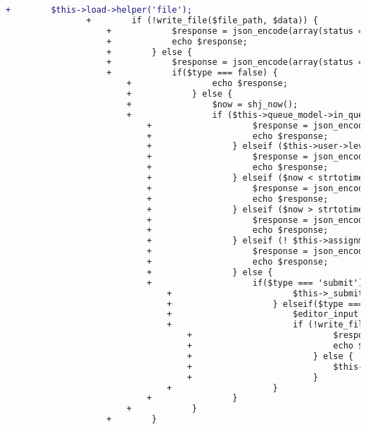 \begin{lstlisting}[language=diff, caption=Perubahan pada kode Submit.php]
				+        $this->load->helper('file');
				+        if (!write_file($file_path, $data)) {
					+            $response = json_encode(array(status => false, message => 'Unable to save'));
					+            echo $response;
					+        } else {
					+            $response = json_encode(array(status => true, message => 'Saved'));
					+            if($type === false) {
						+                echo $response;
						+            } else {
						+                $now = shj_now();
						+                if ($this->queue_model->in_queue($this->user->username, $this->user->selected_assignment['id'], $this->problem['id'])) {
							+                    $response = json_encode(array(status => false, message => 'You have already submitted for this problem. Your last submission is still in queue.'));
							+                    echo $response;
							+                } elseif ($this->user->level == 0 && !$this->user->selected_assignment['open']) {
							+                    $response = json_encode(array(status => false, message => 'Selected assignment has been closed.'));
							+                    echo $response;
							+                } elseif ($now < strtotime($this->user->selected_assignment['start_time'])) {
							+                    $response = json_encode(array(status => false, message => 'Selected assignment has not started.'));
							+                    echo $response;
							+                } elseif ($now > strtotime($this->user->selected_assignment['finish_time']) + $this->user->selected_assignment['extra_time']) {
							+                    $response = json_encode(array(status => false, message => 'Selected assignment has finished.'));
							+                    echo $response;
							+                } elseif (! $this->assignment_model->is_participant($this->user->selected_assignment['participants'], $this->user->username)) {
							+                    $response = json_encode(array(status => false, message => 'You are not registered for submitting.'));
							+                    echo $response;
							+                } else {
							+                    if($type === 'submit') {
								+                        $this->_submit($data, $problem_id, $language, $user_dir);
								+                    } elseif($type === 'execute') {
								+                        $editor_input =  $_POST['editor_input'];
								+                        if (!write_file($input_path, $editor_input)) {
									+                            $response = json_encode(array(status => false, message => 'Unable to write input file'));
									+                            echo $response;
									+                        } else {
									+                            $this->_execute($data, $problem_id, $language, $user_dir);
									+                        }
								+                    }
							+                }
						+            }
					+        }
				

\end{lstlisting}
